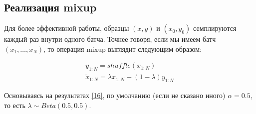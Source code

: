 \subsection{Реализация mixup}
Для более эффективной работы, образцы $(x, y)$ и $(x_0, y_0)$ семплируются каждый раз внутри одного батча. Точнее говоря, если мы имеем батч $(x_1, \dots, x_N)$, то операция mixup выглядит следующим образом:

\begin{equation}
\begin{split}
y_{1:N} = shuffle(x_{1:N}) \\
\tilde{x}_{1:N} = \lambda x_{1:N} + (1 - \lambda) y_{1:N}
\end{split}
\end{equation}

Основываясь на результатах \hyperlink{cite.Bas19}{[16]}, по умолчанию (если не сказано иного) $\alpha = 0.5$, то есть $\lambda \sim Beta(0.5, 0.5)$.

\newpage
